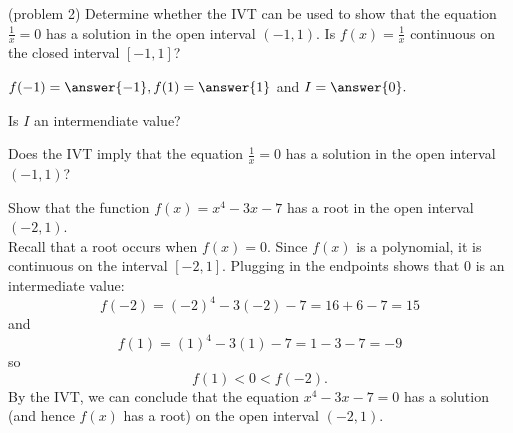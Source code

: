 \documentclass{ximera}
\begin{document}
\begin{problem}(problem 2)
Determine whether the IVT can be used to show that the equation $\frac{1}{x} = 0$ has a solution in the open interval $(-1, 1).$
Is $f(x) = \frac{1}{x}$ continuous on the closed interval $[-1,1]$? 
\begin{center}
\begin{multipleChoice}
\end{multipleChoice}
\end{center}

$f(-1) = \answer{-1}, f(1) = \answer{1}$ and $I = \answer{0}.$

Is $I$ an intermendiate value? 
\begin{multipleChoice}
\end{multipleChoice}

Does the IVT imply that the equation $\frac{1}{x} = 0$ has a solution in the open interval $(-1, 1)$?
\begin{multipleChoice}
\end{multipleChoice}
\end{problem}




\begin{example}[example 3]
Show that the function $f(x) = x^4 - 3x - 7$ has a root in the open interval $(-2, 1)$.\\

Recall that a root occurs when $f(x) = 0$. Since $f(x)$ is a polynomial, it is continuous on the interval 
$[-2, 1]$. Plugging in the endpoints shows that 0 is an intermediate value:
\[f(-2) = (-2)^4 - 3(-2) - 7 = 16 + 6 - 7 = 15 \]
and
\[f(1) = (1)^4 - 3(1) - 7 = 1 -3 - 7 = -9 \]
so 
\[f(1) < 0 < f(-2).\]
By the IVT, we can conclude that the equation $x^4 - 3x - 7 = 0$ has a solution (and hence $f(x)$ has a root) 
on the open interval $(-2, 1)$.
\end{example}
\end{document}
